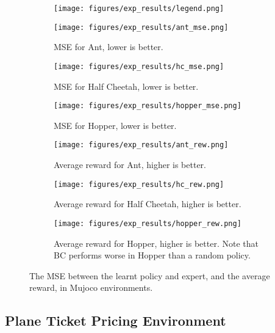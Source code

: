 \begin{figure*}[t!]
\begin{subfigure}[t]{1\textwidth}
\centering\texttt{[image: figures/exp\_results/legend.png]}
\end{subfigure}
\begin{subfigure}[t]{0.33\textwidth}
\centering\captionsetup{width=0.9\linewidth}\texttt{[image: figures/exp\_results/ant\_mse.png]}
\caption{MSE for Ant, lower is better.}
\end{subfigure}
\begin{subfigure}[t]{0.33\textwidth}
\centering\captionsetup{width=0.9\linewidth}\texttt{[image: figures/exp\_results/hc\_mse.png]}
\caption{MSE for Half Cheetah, lower is better.}
\end{subfigure}
\begin{subfigure}[t]{0.33\textwidth}
\centering\captionsetup{width=0.9\linewidth}\texttt{[image: figures/exp\_results/hopper\_mse.png]}
\caption{MSE for Hopper, lower is better.}
\end{subfigure}
\vspace{.5cm}

\begin{subfigure}[t]{0.33\textwidth}
\centering\captionsetup{width=0.9\linewidth}\texttt{[image: figures/exp\_results/ant\_rew.png]}
\caption{Average reward for Ant, higher is better.}
    \label{fig:ant_rew}
\end{subfigure}
\begin{subfigure}[t]{0.33\textwidth}
\centering\captionsetup{width=0.9\linewidth}\texttt{[image: figures/exp\_results/hc\_rew.png]}
\caption{Average reward for Half Cheetah, higher is better.}
    \label{fig:hc_rew}
\end{subfigure}
\begin{subfigure}[t]{0.33\textwidth}
\centering\captionsetup{width=1\linewidth}\texttt{[image: figures/exp\_results/hopper\_rew.png]}
\caption{Average reward for Hopper, higher is better. Note that BC performs worse in Hopper than a random policy.}
\label{fig:hopper_rew}
\end{subfigure}
\caption{The MSE between the learnt policy and expert, and the average reward, in Mujoco environments.}
\label{fig:gym}
\end{figure*}

\subsection{Plane Ticket Pricing Environment}
